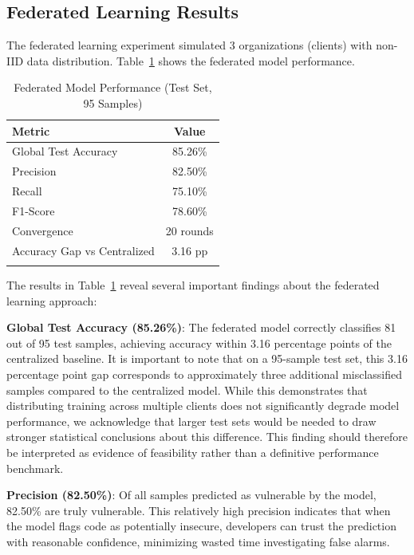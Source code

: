 \documentclass[pdflatex,sn-mathphys-num]{sn-jnl}
\theoremstyle{thmstyleone}%
\theoremstyle{thmstyletwo}%
\theoremstyle{thmstylethree}%
\begin{document}
\subsection{Federated Learning Results}\label{subsec:flresults}

The federated learning experiment simulated 3 organizations (clients) with non-IID data distribution. Table~\ref{tab:federated} shows the federated model performance.

\begin{table}[h]
\caption{Federated Model Performance (Test Set, 95 Samples)}\label{tab:federated}
\begin{tabular}{lc}
\toprule
\textbf{Metric} & \textbf{Value} \\ 
\midrule
Global Test Accuracy & 85.26\% \\
Precision & 82.50\% \\
Recall & 75.10\% \\
F1-Score & 78.60\% \\
\midrule
Convergence & 20 rounds \\
Accuracy Gap vs Centralized & 3.16 pp \\
\botrule
\end{tabular}
\end{table}

The results in Table~\ref{tab:federated} reveal several important findings about the federated learning approach:

\textbf{Global Test Accuracy (85.26\%)}: The federated model correctly classifies 81 out of 95 test samples, achieving accuracy within 3.16 percentage points of the centralized baseline. It is important to note that on a 95-sample test set, this 3.16 percentage point gap corresponds to approximately three additional misclassified samples compared to the centralized model. While this demonstrates that distributing training across multiple clients does not significantly degrade model performance, we acknowledge that larger test sets would be needed to draw stronger statistical conclusions about this difference. This finding should therefore be interpreted as evidence of feasibility rather than a definitive performance benchmark.

\textbf{Precision (82.50\%)}: Of all samples predicted as vulnerable by the model, 82.50\% are truly vulnerable. This relatively high precision indicates that when the model flags code as potentially insecure, developers can trust the prediction with reasonable confidence, minimizing wasted time investigating false alarms.
\end{document}

